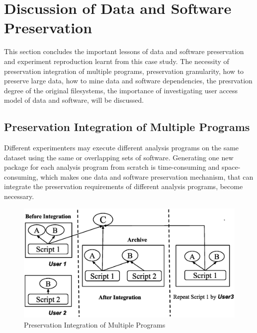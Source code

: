 \documentclass{sig-alternate}
\begin{document}
\section{Discussion of Data and Software Preservation}

This section concludes the important lessons of data and software preservation and experiment reproduction learnt from this case study. 
The necessity of preservation integration of multiple programs, preservation granularity, how to preserve large data, how to mine data and software dependencies,
the presrvation degree of the original filesystems, the importance of investigating user access model of data and software, will be discussed. 

\subsection{Preservation Integration of Multiple Programs}

Different experimenters may execute different analysis
programs on the same dataset using the same or overlapping sets of software.
Generating one new package for each analysis program from scratch is
time-consuming and space-consuming, which makes one data and software
preservation mechanism, that can integrate the preservation requirements of
different analysis programs, become necessary. 

\begin{figure}
\centering
\includegraphics[width=1\columnwidth]{preservation-integration.eps}
\caption{Preservation Integration of Multiple Programs}
\label{fig:Preservation integration}
\end{figure}
\end{document}
